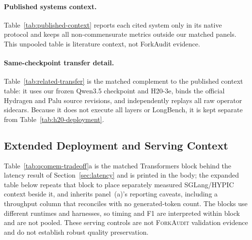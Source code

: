 \documentclass{article}
\newcommand{\method}{\textsc{ForkAudit}}
\begin{document}
\paragraph{Published systems context.}
Table~\ref{tab:published-context} reports each cited system only in its native
protocol and keeps all non-commensurate metrics outside our matched panels.
This unpooled table is literature context, not ForkAudit evidence.


\paragraph{Same-checkpoint transfer detail.}
Table~\ref{tab:related-transfer} is the matched complement to the published
context table: it uses our frozen Qwen3.5 checkpoint and H20-3e, binds the
official Hydragen and Palu source revisions, and independently replays all raw
operator sidecars.  Because it does not execute all layers or LongBench, it is
kept separate from Table~\ref{tab:h20-deployment}.


\subsection{Extended Deployment and Serving Context}
\label{app:illustrative-store}

Table~\ref{tab:qcomem-tradeoff}a is the matched Transformers block behind the
latency result of Section~\ref{sec:latency} and is printed in the body; the
expanded table below repeats that block to place separately measured
SGLang/HYPIC context beside it, and inherits panel~(a)'s reporting caveats,
including a throughput column that reconciles with no generated-token count.
The blocks use different runtimes and harnesses, so timing and F1 are
interpreted within block and are not pooled.  These serving controls are not
\method{} validation evidence and do not establish robust quality preservation.


\end{document}
